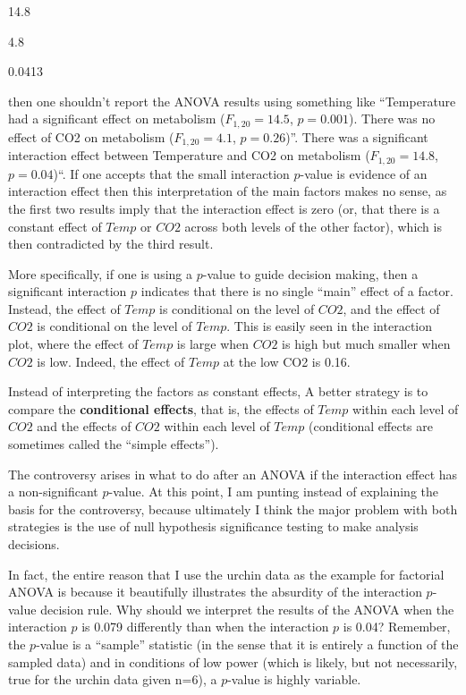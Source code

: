 \documentclass[]{book}
\begin{document}
14.8

4.8

0.0413

then one shouldn't report the ANOVA results using something like
``Temperature had a significant effect on metabolism
(\(F_{1,20} = 14.5\), \(p=0.001\)). There was no effect of CO2 on
metabolism (\(F_{1,20} = 4.1\), \(p=0.26\))''. There was a significant
interaction effect between Temperature and CO2 on metabolism
(\(F_{1,20} = 14.8\), \(p=0.04\))``. If one accepts that the small
interaction \(p\)-value is evidence of an interaction effect then this
interpretation of the main factors makes no sense, as the first two
results imply that the interaction effect is zero (or, that there is a
constant effect of \(Temp\) or \(CO2\) across both levels of the other
factor), which is then contradicted by the third result.

More specifically, if one is using a \(p\)-value to guide decision
making, then a significant interaction \(p\) indicates that there is no
single ``main'' effect of a factor. Instead, the effect of \(Temp\) is
conditional on the level of \(CO2\), and the effect of \(CO2\) is
conditional on the level of \(Temp\). This is easily seen in the
interaction plot, where the effect of \(Temp\) is large when \(CO2\) is
high but much smaller when \(CO2\) is low. Indeed, the effect of
\(Temp\) at the low CO2 is 0.16.

Instead of interpreting the factors as constant effects, A better
strategy is to compare the \textbf{conditional effects}, that is, the
effects of \(Temp\) within each level of \(CO2\) and the effects of
\(CO2\) within each level of \(Temp\) (conditional effects are sometimes
called the ``simple effects'').

The controversy arises in what to do after an ANOVA if the interaction
effect has a non-significant \(p\)-value. At this point, I am punting
instead of explaining the basis for the controversy, because ultimately
I think the major problem with both strategies is the use of null
hypothesis significance testing to make analysis decisions.

In fact, the entire reason that I use the urchin data as the example for
factorial ANOVA is because it beautifully illustrates the absurdity of
the interaction \(p\)-value decision rule. Why should we interpret the
results of the ANOVA when the interaction \(p\) is 0.079 differently
than when the interaction \(p\) is 0.04? Remember, the \(p\)-value is a
``sample'' statistic (in the sense that it is entirely a function of the
sampled data) and in conditions of low power (which is likely, but not
necessarily, true for the urchin data given n=6), a \(p\)-value is
highly variable.
\end{document}
